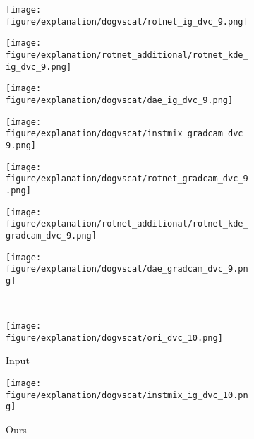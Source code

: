 \documentclass{article} \usepackage{iclr2021_conference,times}
\begin{document}
\begin{figure}[h!]
\begin{subfigure}{.11\textwidth}
  \centering
  \texttt{[image: figure/explanation/dogvscat/rotnet\_ig\_dvc\_9.png]}
\end{subfigure}
\hspace{-2mm}
\begin{subfigure}{.11\textwidth}
  \centering
  \texttt{[image: figure/explanation/rotnet\_additional/rotnet\_kde\_ig\_dvc\_9.png]}
\end{subfigure}
\hspace{-2mm}
\begin{subfigure}{.11\textwidth}
  \centering
  \texttt{[image: figure/explanation/dogvscat/dae\_ig\_dvc\_9.png]}
\end{subfigure}
\hspace{-2mm}
\begin{subfigure}{.11\textwidth}
  \centering
  \texttt{[image: figure/explanation/dogvscat/instmix\_gradcam\_dvc\_9.png]}
\end{subfigure}
\hspace{-2mm}
\begin{subfigure}{.11\textwidth}
  \centering
  \texttt{[image: figure/explanation/dogvscat/rotnet\_gradcam\_dvc\_9.png]}
\end{subfigure}
\hspace{-2mm}
\begin{subfigure}{.11\textwidth}
  \centering
  \texttt{[image: figure/explanation/rotnet\_additional/rotnet\_kde\_gradcam\_dvc\_9.png]}
\end{subfigure}
\hspace{-2mm}
\begin{subfigure}{.11\textwidth}
  \centering
  \texttt{[image: figure/explanation/dogvscat/dae\_gradcam\_dvc\_9.png]}
\end{subfigure}\\
\begin{subfigure}{.11\textwidth}
  \centering
  \texttt{[image: figure/explanation/dogvscat/ori\_dvc\_10.png]}
  \caption{Input}
\end{subfigure}
\hspace{-2mm}
\begin{subfigure}{.11\textwidth}
  \centering
  \texttt{[image: figure/explanation/dogvscat/instmix\_ig\_dvc\_10.png]}
  \caption{Ours}
\end{subfigure}
\hspace{-2mm}
\begin{subfigure}{.11\textwidth}

\end{subfigure}
\end{figure}
\end{document}
